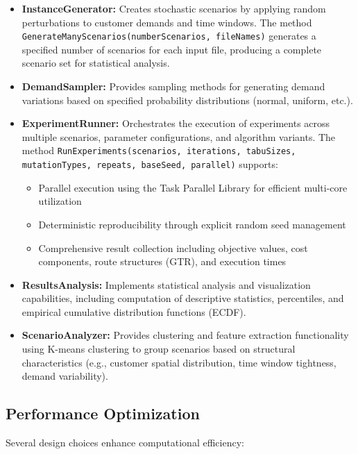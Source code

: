 \begin{itemize}
    \item \textbf{InstanceGenerator:} Creates stochastic scenarios by applying random perturbations to customer demands and time windows. The method \texttt{GenerateManyScenarios(numberScenarios, fileNames)} generates a specified number of scenarios for each input file, producing a complete scenario set for statistical analysis.
    
    \item \textbf{DemandSampler:} Provides sampling methods for generating demand variations based on specified probability distributions (normal, uniform, etc.).
    
    \item \textbf{ExperimentRunner:} Orchestrates the execution of experiments across multiple scenarios, parameter configurations, and algorithm variants. The method \texttt{RunExperiments(scenarios, iterations, tabuSizes, mutationTypes, repeats, baseSeed, parallel)} supports:
    \begin{itemize}
        \item Parallel execution using the Task Parallel Library for efficient multi-core utilization
        \item Deterministic reproducibility through explicit random seed management
        \item Comprehensive result collection including objective values, cost components, route structures (GTR), and execution times
    \end{itemize}
    
    \item \textbf{ResultsAnalysis:} Implements statistical analysis and visualization capabilities, including computation of descriptive statistics, percentiles, and empirical cumulative distribution functions (ECDF).
    
    \item \textbf{ScenarioAnalyzer:} Provides clustering and feature extraction functionality using K-means clustering to group scenarios based on structural characteristics (e.g., customer spatial distribution, time window tightness, demand variability).
\end{itemize}

\subsection{Performance Optimization}

Several design choices enhance computational efficiency:

